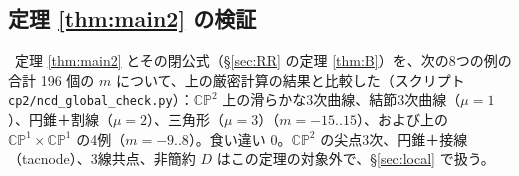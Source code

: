 \subsection{定理 \ref{thm:main2} の検証}
\tV\ 定理 \ref{thm:main2} とその閉公式（\S\ref{sec:RR} の定理 \ref{thm:B}）を、次の8つの例の合計 196 個の $m$ について、上の厳密計算の結果と比較した（スクリプト \texttt{cp2/ncd\_global\_check.py}）：$\mathbb{CP}^2$ 上の滑らかな3次曲線、結節3次曲線（$\mu=1$）、円錐＋割線（$\mu=2$）、三角形（$\mu=3$）（$m=-15..15$）、および上の $\mathbb{CP}^1\times\mathbb{CP}^1$ の4例（$m=-9..8$）。食い違い 0。$\mathbb{CP}^2$ の尖点3次、円錐＋接線（tacnode）、3線共点、非簡約 $D$ はこの定理の対象外で、\S\ref{sec:local} で扱う。
